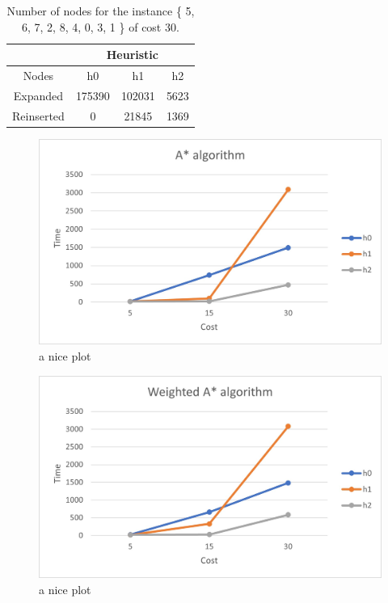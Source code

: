 \documentclass[runningheads]{llncs}
\begin{document}
\begin{table}[H]
    \centering
\caption{\label{tab:table2}Number of nodes for the instance \{ 5, 6, 7, 2, 8, 4, 0, 3, 1 \} of cost 30.}
    \begin{tabular}{|c|c|c|c|}
    \hline
       & \multicolumn{3}{|c|}{Heuristic} \\ \hline
        Nodes & h0 & h1 & h2 \\ \hline
        Expanded & 175390 & 102031 & 5623 \\ \hline
        Reinserted & 0 & 21845 & 1369 \\ \hline
    \end{tabular}
\end{table}

\begin{figure}[H]
    \centering
    \includegraphics{AStarTimes.jpg}
    \caption{a nice plot}
    \label{fig:mesh1}
\end{figure}

\begin{figure}[H]
    \centering
    \includegraphics{WeightedAStarTimes.jpg}
    \caption{a nice plot}
    \label{fig:mesh1}
\end{figure}
\end{document}
